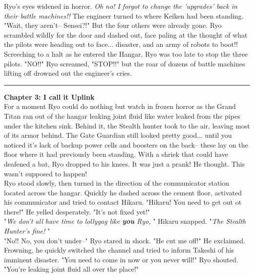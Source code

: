 \documentclass[11pt,twoside,a4paper]{book}
\begin{document}
\begin{multicols*}{2}
Ryo's eyes widened in horror. \emph{Oh no! I forgot to change the 'upgrades' back in their battle machines!!} The engineer turned to where Keiken had been standing. "Wait, they aren't-- Sensei?!" But the four others were already gone. Ryo scrambled wildly for the door and dashed out, face paling at the thought of what the pilots were heading out to face... disaster, and an army of robots to boot!! ~\\

Screeching to a halt as he entered the Hangar, Ryo was too late to stop the three pilots. "NO!!" Ryo screamed, "STOP!!" but the roar of dozens of battle machines lifting off drowned out the engineer's cries. %

\begin{center} \rule{0.45\textwidth}{0.01cm} \end{center}


\textbf{\large Chapter 3: I call it Uplink} ~\\

For a moment Ryo could do nothing but watch in frozen horror as the Grand Titan ran out of the hangar leaking joint fluid like water leaked from the pipes under the kitchen sink. Behind it, the Stealth hunter took to the air, leaving most of its armor behind. The Gate Guardian still looked pretty good... until you noticed it's lack of backup power cells and boosters on the back-- these lay on the floor where it had previously been standing. With a shriek that could have deafened a bat, Ryo dropped to his knees. It was just a prank! He thought. This wasn't supposed to happen! ~\\

Ryo stood slowly, then turned in the direction of the communicator station located across the hangar. Quickly he dashed across the cement floor, activated his communicator and tried to contact Hikaru. "Hikaru! You need to get out ot there!" He yelled desperately. "It's not fixed yet!" ~\\

"\emph{We don't all have time to lollygag like \textbf{you} Ryo, }" Hikaru snapped. "\emph{The Stealth Hunter's fine!} " ~\\

"No!! No, you don't under--" Ryo stared in shock. "He cut me off!" He exclaimed. Frowning, he quickly switched the channel and tried to inform Takeshi of his imminent disaster. "You need to come in now or you never will!" Ryo shouted. "You're leaking joint fluid all over the place!" ~\\


\end{multicols*}
\end{document}
